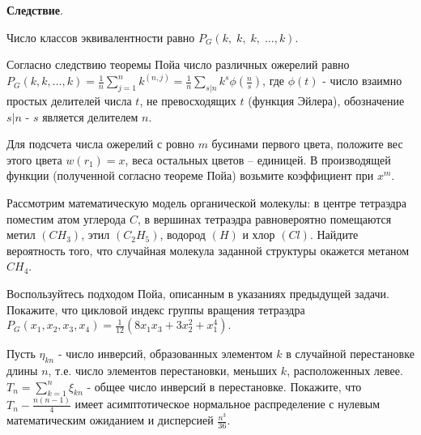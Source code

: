 \textbf{Следствие}. 

Число классов эквивалентности равно $P_{G} \left(k,\; k,\; k,\; \ldots ,k\right)$.

Согласно следствию теоремы Пойа число различных ожерелий равно $P_{G} (k,k,\ldots ,k)=\frac{1}{n} \sum _{j=1}^{n}k^{(n,j)}  =\frac{1}{n} \sum _{s|n}k^{s} \phi \left(\frac{n}{s} \right) $, где $\phi \left(t\right)$ - число взаимно простых делителей числа $t$, не превосходящих $t$ (функция Эйлера), обозначение $s|n$ - $s$ является делителем $n$.

Для подсчета числа ожерелий с ровно $m$ бусинами первого цвета, положите вес этого цвета $w(r_{1} )=x$, веса остальных цветов -- единицей. В производящей функции (полученной согласно теореме Пойа) возьмите коэффициент при $x^{m} $.



\begin{problem}

Рассмотрим математическую модель органической молекулы: в центре тетраэдра поместим атом углерода $C$, в вершинах тетраэдра равновероятно помещаются метил $\left(CH_{3} \right)$, этил $\left(C_{2} H_{5} \right)$, водород $\left(H\right)$ и хлор $\left(Cl\right)$. Найдите вероятность того, что случайная молекула заданной структуры окажется метаном $CH_{4} $. 

\end{problem}

\begin{ordre}
 Воспользуйтесь подходом Пойа, описанным в указаниях предыдущей задачи. Покажите, что цикловой индекс группы вращения тетраэдра $P_{G} (x_{1} ,x_{2} ,x_{3} ,x_{4} )=\frac{1}{12} \left(8x_{1} x_{3} +3x_{2} ^{2} +x_{1} ^{4} \right).$
\end{ordre}


\begin{problem}

Пусть $\eta _{kn} $ - число инверсий, образованных элементом $k$ в случайной перестановке длины $n$, т.е. число элементов перестановки, меньших $k$, расположенных левее. $T_{n} =\sum _{k=1}^{n}\xi _{kn}  $ - общее число инверсий в перестановке. Покажите, что $T_{n} -\frac{n(n-1)}{4} $ имеет асимптотическое нормальное распределение с нулевым математическим ожиданием и дисперсией $\frac{n^{3} }{36} $.

\end{problem}








